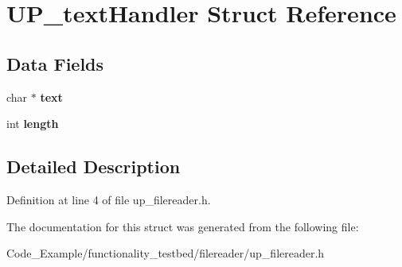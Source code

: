 \hypertarget{struct_u_p__text_handler}{}\section{U\+P\+\_\+text\+Handler Struct Reference}
\label{struct_u_p__text_handler}
\subsection*{Data Fields}
\begin{DoxyCompactItemize}
\item 
\hypertarget{struct_u_p__text_handler_a5633b1433389cec21ade3811bbe9ca5b}{}char $\ast$ {\bfseries text}\label{struct_u_p__text_handler_a5633b1433389cec21ade3811bbe9ca5b}

\item 
\hypertarget{struct_u_p__text_handler_a9f59b34b1f25fe00023291b678246bcc}{}int {\bfseries length}\label{struct_u_p__text_handler_a9f59b34b1f25fe00023291b678246bcc}

\end{DoxyCompactItemize}


\subsection{Detailed Description}


Definition at line 4 of file up\+\_\+filereader.\+h.



The documentation for this struct was generated from the following file\+:\begin{DoxyCompactItemize}
\item 
Code\+\_\+\+Example/functionality\+\_\+testbed/filereader/up\+\_\+filereader.\+h\end{DoxyCompactItemize}
